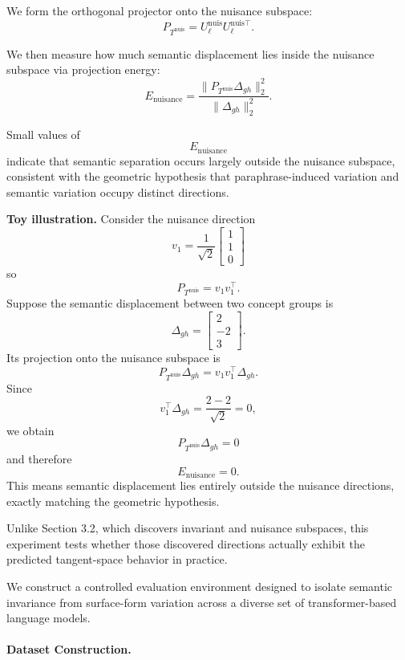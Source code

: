 We form the orthogonal projector onto the nuisance subspace:
\[
P_{T^{\mathrm{nuis}}}
=
U_\ell^{\mathrm{nuis}}
U_\ell^{\mathrm{nuis}\top}.
\]

We then measure how much semantic displacement lies inside the nuisance subspace via projection energy:
\[
E_{\mathrm{nuisance}}
=
\frac{
\|P_{T^{\mathrm{nuis}}}\Delta_{gh}\|_2^2
}{
\|\Delta_{gh}\|_2^2
}.
\]

Small values of
\[
E_{\mathrm{nuisance}}
\]
indicate that semantic separation occurs largely outside the nuisance subspace, consistent with the geometric hypothesis that paraphrase-induced variation and semantic variation occupy distinct directions.

\noindent\textbf{Toy illustration.}
Consider the nuisance direction
\[
v_1=
\frac1{\sqrt2}
\begin{bmatrix}
1\\
1\\
0
\end{bmatrix}
\]
so
\[
P_{T^{\mathrm{nuis}}}
=
v_1v_1^\top.
\]
Suppose the semantic displacement between two concept groups is
\[
\Delta_{gh}
=
\begin{bmatrix}
2\\
-2\\
3
\end{bmatrix}.
\]
Its projection onto the nuisance subspace is
\[
P_{T^{\mathrm{nuis}}}\Delta_{gh}
=
v_1v_1^\top \Delta_{gh}.
\]
Since
\[
v_1^\top \Delta_{gh}
=
\frac{2-2}{\sqrt2}
=0,
\]
we obtain
\[
P_{T^{\mathrm{nuis}}}\Delta_{gh}=0
\]
and therefore
\[
E_{\mathrm{nuisance}}=0.
\]
This means semantic displacement lies entirely outside the nuisance directions, exactly matching the geometric hypothesis.

Unlike Section 3.2, which discovers invariant and nuisance subspaces, this experiment tests whether those discovered directions actually exhibit the predicted tangent-space behavior in practice. 
















We construct a controlled evaluation environment designed to isolate semantic invariance from surface-form variation across a diverse set of transformer-based language models.

\paragraph{Dataset Construction.}

